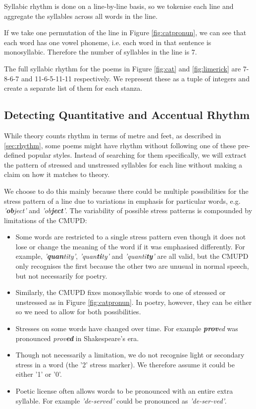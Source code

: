 Syllabic rhythm is done on a line-by-line basis, so we tokenise each line and aggregate the syllables across all words in the line.

If we take one permutation of the line in Figure \ref{fig:catpronun}, we can see that each word has one vowel phoneme, i.e. each word in that sentence is monosyllabic. Therefore the number of syllables in the line is 7.

The full syllabic rhythm for the poems in Figure \ref{fig:cat} and \ref{fig:limerick} are 7-8-6-7 and 11-6-5-11-11 respectively. We represent these as a tuple of integers and create a separate list of them for each stanza.

\subsection{Detecting Quantitative and Accentual Rhythm}

While theory counts rhythm in terms of metre and feet, as described in \ref{sec:rhythm}, some poems might have rhythm without following one of these pre-defined popular styles. Instead of searching for them specifically, we will extract the pattern of stressed and unstressed syllables for each line without making a claim on how it matches to theory.

We choose to do this mainly because there could be multiple possibilities for the stress pattern of a line due to variations in emphasis for particular words, e.g. \textit{'\textbf{ob}ject'} and \textit{'ob\textbf{ject}'}. The variability of possible stress patterns is compounded by limitations of the CMUPD:
\begin{itemize}
\item{Some words are restricted to a single stress pattern even though it does not lose or change the meaning of the word if it was emphasised differently. For example, \textit{'\textbf{quan}tity'}, \textit{'quan\textbf{ti}ty'} and \textit{'quanti\textbf{ty}'} are all valid, but the CMUPD only recognises the first because the other two are unusual in normal speech, but not necessarily for poetry.}
\item{Similarly, the CMUPD fixes monosyllabic words to one of stressed or unstressed as in Figure \ref{fig:catpronun}. In poetry, however, they can be either so we need to allow for both possibilities.}
\item{Stresses on some words have changed over time. For example \textit{\textbf{prov}ed} was pronounced \textit{prov\textbf{ed}} in Shakespeare's era.}
\item{Though not necessarily a limitation, we do not recognise light or secondary stress in a word (the '2' stress marker). We therefore assume it could be either '1' or '0'.}
\item{Poetic license often allows words to be pronounced with an entire extra syllable. For example \textit{'de-served'} could be pronounced as \textit{'de-ser-ved'}.}
\end{itemize}

